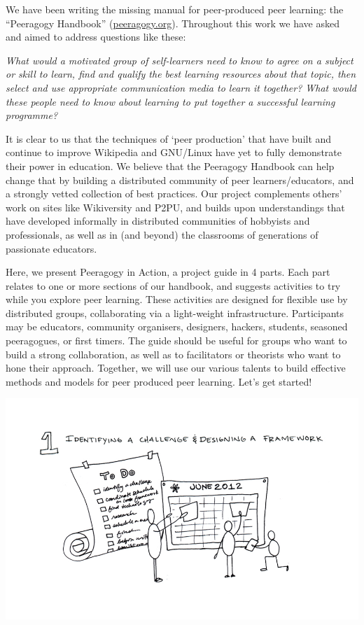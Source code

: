 We have been writing the missing manual for peer-produced peer learning:
the ``Peeragogy Handbook''
(\href{http://peeragogy.org/}{peeragogy.org}). Throughout this work we
have asked and aimed to address questions like these:

\emph{What would a motivated group of self-learners need to know to
agree on a subject or skill to learn, find and qualify the best learning
resources about that topic, then select and use appropriate
communication media to learn it together? What would these people need
to know about learning to put together a successful learning programme?}

It is clear to us that the techniques of `peer production' that have
built and continue to improve Wikipedia and GNU/Linux have yet to fully
demonstrate their power in education. We believe that the Peeragogy
Handbook can help change that by building a distributed community of
peer learners/educators, and a strongly vetted collection of best
practices. Our project complements others' work on sites like
Wikiversity and P2PU, and builds upon understandings that have developed
informally in distributed communities of hobbyists and professionals, as
well as in (and beyond) the classrooms of generations of passionate
educators.

Here, we present Peeragogy in Action, a project guide in 4 parts. Each
part relates to one or more sections of our handbook, and suggests
activities to try while you explore peer learning. These activities are
designed for flexible use by distributed groups, collaborating via a
light-weight infrastructure. Participants may be educators, community
organisers, designers, hackers, students, seasoned peeragogues, or first
timers. The guide should be useful for groups who want to build a strong
collaboration, as well as to facilitators or theorists who want to hone
their approach. Together, we will use our various talents to build
effective methods and models for peer produced peer learning. Let's get
started!

\begin{center}
\includegraphics{./pictures/OpenBook-2-1.jpg}
\end{center}

